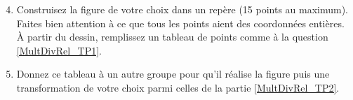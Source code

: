 \begin{TP}[Morphing]
\begin{enumerate}
 \setcounter{enumi}{3}
 \item Construisez la figure de votre choix dans un repère (15 points au maximum). Faites bien attention à ce que tous les points aient des coordonnées entières. À partir du dessin, remplissez un tableau de points comme à la question \ref{MultDivRel_TP1}.
 \item Donnez ce tableau à un autre groupe pour qu'il réalise la figure puis une transformation de votre choix parmi celles de la partie \ref{MultDivRel_TP2}.
 \end{enumerate}

\end{TP}


